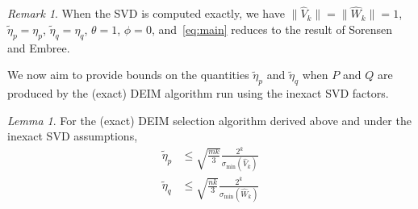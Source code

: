\documentclass[12pt, a4paper]{article}
\newcommand{\What}{\widehat{W}}
\newcommand{\Vhat}{\widehat{V}}
\newcommand{\E}{\theta}
\newcommand{\F}{\phi}
\def\norm#1{\|#1\|}
\theoremstyle{remark}
\newtheorem{lemma}[theorem]{Lemma}
\newtheorem{remark}[theorem]{Remark}
\begin{document}
\begin{remark}
\label{rem:recovery}
When the SVD is computed exactly, we have $\norm{\Vhat_k} = \norm{\What_k} = 1$,
$\tilde\eta_p = \eta_p$, $\tilde\eta_q = \eta_q$, $\E = 1$, $\F = 0$,
and~\eqref{eq:main} reduces to the result of Sorensen and Embree. 
\end{remark}




We now aim to provide bounds on the quantities $\tilde{\eta}_p$ and $\tilde{\eta}_q$ when $P$ and $Q$ are produced by the (exact) DEIM algorithm run using the inexact SVD factors.     

\begin{lemma}\label{lemma_eta_exact_DEIM}
    For the (exact) DEIM selection algorithm derived above and under the inexact SVD assumptions, 
    \begin{equation}
    \begin{split}
        \tilde{\eta}_p &\leq \sqrt{\frac{mk}{3}}\frac{2^k}{\sigma_{\min}(\Vhat_k)}\\ 
        \tilde{\eta}_q &\leq \sqrt{\frac{nk}{3}}\frac{2^k}{\sigma_{\min}(\What_k)}        
    \end{split}
    \end{equation}
\end{lemma}
\end{document}
